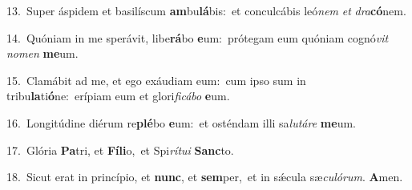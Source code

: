{\numbfont\textcolor{\numbcolor}{13.}}~Super áspidem et basilíscum \textbf{am}\-bu\-\textbf{lá}\-bis:~\star et conculcábis leó\textit{nem} \textit{et} \textit{dra}\-\textbf{có}nem.\par
{\numbfont\textcolor{\numbcolor}{14.}}~Quóniam in me sperávit, libe\-\textbf{rá}\-bo \textbf{e}\-um:~\star prótegam eum quóniam cognó\textit{vit} \textit{no}\-\textit{men} \textbf{me}\-um.\par
{\numbfont\textcolor{\numbcolor}{15.}}~Clamábit ad me, et ego exáudiam eum:~\dagger cum ipso sum in tribu\-\textbf{la}\-ti\-\textbf{ó}\-ne:~\star erípiam eum et glori\-\textit{fi}\-\textit{cá}\textit{bo} \textbf{e}\-um.\par
{\numbfont\textcolor{\numbcolor}{16.}}~Longitúdine diérum re\-\textbf{plé}\-bo \textbf{e}\-um:~\star et osténdam illi sa\-\textit{lu}\-\textit{tá}\textit{re} \textbf{me}\-um.\par
{\numbfont\textcolor{\numbcolor}{17.}}~Glória \textbf{Pa}\-tri, et \textbf{Fí}\-\textbf{li}o,~\star et Spi\-\textit{rí}\-\textit{tu}\textit{i} \textbf{Sanc}\-to.\par
{\numbfont\textcolor{\numbcolor}{18.}}~Sicut erat in princípio, et \textbf{nunc}\-, et \textbf{sem}\-per,~\star et in sǽcula sæ\-\textit{cu}\-\textit{ló}\textit{rum}. \textbf{A}\-men.\par
